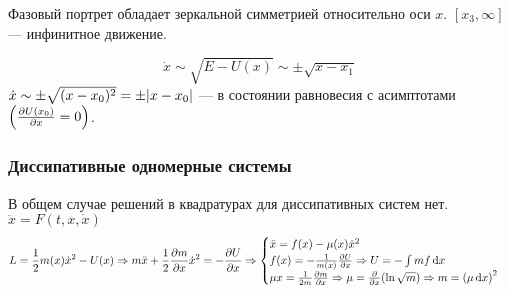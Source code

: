 \documentclass[12pt]{article}
\begin{document}
Фазовый портрет обладает зеркальной симметрией относительно оси $x$.
$[x_3, \infty]$ --- инфинитное движение.

\[\dot{x} \sim \sqrt{E - U(x)} \sim \pm \sqrt{x - x_1}\]
$\dot{x} \sim \pm \sqrt{(x - x_0)^2} = \pm \abs{x-x_0}$ --- в состоянии равновесия с асимптотами $\left(\pdv{U(x_0)}{x} =0\right)$.

\subsubsection{Диссипативные одномерные системы}
В общем случае решений в квадратурах для диссипативных систем нет. $\ddot{x} = F(t, x, \dot{x})$
\begin{equation}
L = \frac{1}{2} m(x) \dot{x}^2 - U(x) \Rightarrow m\ddot{x} + \frac{1}{2} \pdv{m}{x} \dot{x}^2 = -  \pdv{U}{x} \Rightarrow \begin{cases}
\ddot{x} = f(x) - \mu (x) \dot{x}^2\\
f(x) = - \frac{1}{m(x)} \pdv{U}{x} \Rightarrow U = - \int m f \dd{x}\\
\mu{x} = \frac{1}{2m} \pdv{m}{x} \Rightarrow \mu = \pdv{x} (\ln \sqrt{m}) \Rightarrow m = \left(\mu \dd{x}\right)^2
\end{cases}
\end{equation}


\end{document}
